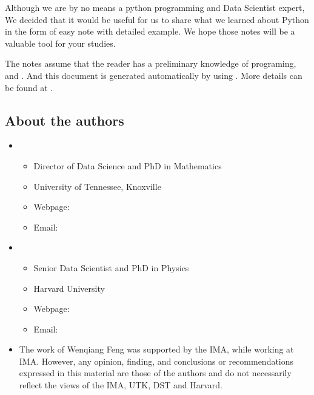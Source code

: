 \documentclass[letterpaper,12pt,english]{sphinxmanual}
\begin{document}
\sphinxAtStartPar
Although we are by no means a python programming and Data Scientist expert,
We decided that it would be useful for us to share what we learned
about Python in the form of easy note with detailed example.
We hope those notes will be a valuable tool for your studies.

\sphinxAtStartPar
The notes assume that the reader has a preliminary knowledge of  programing,  and . And this document is generated automatically by using . More details can be found at .


\subsection{About the authors}
\label{\detokenize{preface:about-the-authors}}\begin{itemize}
\item {} 
\sphinxAtStartPar
{}
\begin{itemize}
\item {} 
\sphinxAtStartPar
Director of Data Science and PhD in Mathematics

\item {} 
\sphinxAtStartPar
University of Tennessee, Knoxville

\item {} 
\sphinxAtStartPar
Webpage: 

\item {} 
\sphinxAtStartPar
Email: 

\end{itemize}

\item {} 
\sphinxAtStartPar
{}
\begin{itemize}
\item {} 
\sphinxAtStartPar
Senior Data Scientist and PhD in Physics

\item {} 
\sphinxAtStartPar
Harvard University

\item {} 
\sphinxAtStartPar
Webpage: 

\item {} 
\sphinxAtStartPar
Email: 

\end{itemize}

\item {} 
\sphinxAtStartPar
{}

\sphinxAtStartPar
The work of Wenqiang Feng was supported by the IMA, while working at IMA. However,
any opinion, finding, and conclusions or recommendations expressed in this material
are those of the authors and do not necessarily reflect the views of the IMA, UTK,
DST and Harvard.

\end{itemize}
\end{document}
